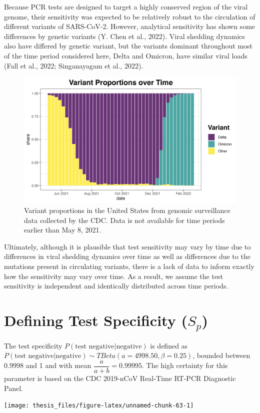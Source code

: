 \documentclass[12pt,twoside]{smiththesis}
\begin{document}
Because PCR tests are designed to target a highly conserved region of the viral genome, their sensitivity was expected to be relatively robust to the circulation of different variants of SARS-CoV-2. However, analytical sensitivity has shown some differences by genetic variants (Y. Chen et al., 2022). Viral shedding dynamics also have differed by genetic variant, but the variants dominant throughout most of the time period considered here, Delta and Omicron, have similar viral loads (Fall et al., 2022; Singanayagam et al., 2022).
\begin{figure}

{\centering \includegraphics[width=0.8\linewidth]{./figure/variant_plot} 

}

\caption{Variant proportions in the United States from genomic surveillance data collected by the CDC. Data is not available for time periods earlier than May 8, 2021.}\label{fig:unnamed-chunk-62}
\end{figure}
Ultimately, although it is plausible that test sensitivity may vary by time due to differences in viral shedding dynamics over time as well as differences due to the mutations present in circulating variants, there is a lack of data to inform exactly how the sensitivity may vary over time. As a result, we assume the test sensitivity is independent and identically distributed across time periods.

\hypertarget{defining-test-specificity-s_p}{%
\section{\texorpdfstring{Defining Test Specificity (\(S_p\))}{Defining Test Specificity (S\_p)}}\label{defining-test-specificity-s_p}}

The test specificity \(P(\text{test negative}| \text{negative})\) is defined as \(P(\text{test negative}| \text{negative}) \sim TBeta(a = 4998.50, \beta = 0.25)\), bounded between 0.9998 and 1 and with mean \(\dfrac{a}{a + b} = 0.99995\). The high certainty for this parameter is based on the CDC 2019-nCoV Real-Time RT-PCR Diagnostic Panel.
\begin{center}\texttt{[image: thesis\_files/figure-latex/unnamed-chunk-63-1]} \end{center}
\end{document}
